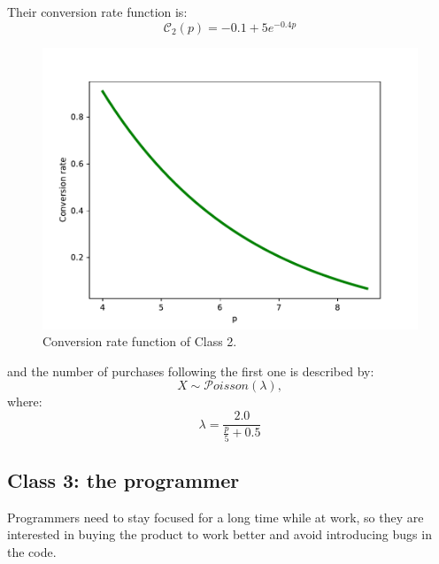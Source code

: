 \documentclass[12pt,a4paper]{report}
\begin{document}
Their conversion rate function is: 
\[ \mathcal C_2(p) = -0.1+ 5 e^{-0.4p}\]
\begin{figure}[H]
\centering
  \includegraphics[scale = 0.7, center]{C2}
  \caption{Conversion rate function of Class 2.}
\end{figure}

and the number of purchases following the first one is described by: 
\[X \sim  \mathcal{P}oisson   (\lambda),\] where:
\[\lambda = \frac{2.0}{\frac p 5 +0.5}  \]

			\subsection{Class 3: the programmer}
Programmers need to stay focused for a long time while at work, so they are interested in buying the product to work better and avoid introducing bugs in the code.
\end{document}
